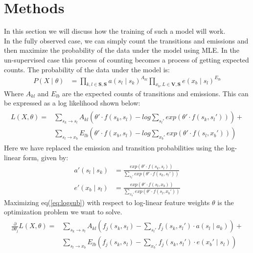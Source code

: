 \documentclass[11pt]{article}
\begin{document}
\section{Methods}
In this section we will discuss how the training of such a model will work. \\
In the fully observed case, we can simply count the transitions and emissions and then 
maximize the probability of the data under the model using MLE. In the un-supervised case this process of counting becomes a process of getting expected counts. The probability of the data under the model is:
\begin{align}
P(X \mid \theta) &= \prod_{ k,l \in \mathbf{S,S}} a(s_l \mid s_k)^{A_{kl}}
\prod_{ x_b,L \in \mathbf{V,S}}e(x_b \mid s_l)^{E_{lb}}\label{eq2}
\end{align}
Where $A_{kl}$ and $E_{lb}$ are the expected counts of transitions and emissions. This can be expressed as a log likelihood shown below:\\
\begin{align}
\begin{split}
L(X,\theta) =& \sum_{s_k \rightarrow s_l} A_{kl} (\theta' \cdot f(s_k, s_l) -
log \sum_{s_l'} exp( \theta' \cdot f(s_k, s_l'))) + \\
& \sum_{s_l \rightarrow x_b} E_{lb} (\theta' \cdot f(x_b, s_l) - log\sum_{x_b'}
exp(\theta' \cdot f(s_l, x_b'))) \label{eq:logsub}
\end{split}
\end{align}
Here we have replaced the emission and transition probabilities using the log-linear form, given by:
\begin{align}
a'(s_l \mid s_k) &= \frac{exp(\theta' \cdot f(s_k, s_l))}{\sum_{s_l'}
exp(\theta' \cdot f(s_k,s_l'))} \label{eq:probakl}\\
e'(x_b \mid s_l) &= \frac{exp(\theta' \cdot
f(s_l, x_b))}{\sum_{x_b'} exp(\theta' \cdot f(s_l, x_b'))} \label{eq:probelb}
\end{align}
Maximizing eq(\ref{eq:logsub}) with respect to log-linear feature weights $\theta$ is the optimization problem we want to solve.
\begin{align}
\begin{split}
\frac{\partial}{\partial\theta_j} L(X,\theta) =&  \sum_{s_k \rightarrow s_l} A_{kl}
(f_j(s_k, s_l) - \sum_{s_l'} f_j(s_k,s_l') \cdot a(s_l\mid a_k)) +\\
& \sum_{s_l \rightarrow x_b} E_{lb}(f_j(s_k, s_l) - \sum_{x_b'} f_j(s_k,s_l')
\cdot e(x_b' \mid s_l)) \label{eq:grad}
\end{split}
\end{align}
\end{document}
